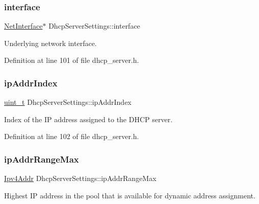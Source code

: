 \subsubsection{\texorpdfstring{interface}{interface}}
{\footnotesize\ttfamily \hyperlink{net_8h_a2234db8911a1148c9159979d8f5e0d6b}{Net\+Interface}$\ast$ Dhcp\+Server\+Settings\+::interface}



Underlying network interface. 



Definition at line 101 of file dhcp\+\_\+server.\+h.

\mbox{\label{structDhcpServerSettings_aaad90677f7fa180236c4ae488ed076f1}} 
\subsubsection{\texorpdfstring{ip\+Addr\+Index}{ipAddrIndex}}
{\footnotesize\ttfamily \hyperlink{compiler__port_8h_a12a1e9b3ce141648783a82445d02b58d}{uint\+\_\+t} Dhcp\+Server\+Settings\+::ip\+Addr\+Index}



Index of the IP address assigned to the D\+H\+CP server. 



Definition at line 102 of file dhcp\+\_\+server.\+h.

\mbox{\label{structDhcpServerSettings_ad1ffb003f59319b0c15e43a6a5e4fa7a}} 
\subsubsection{\texorpdfstring{ip\+Addr\+Range\+Max}{ipAddrRangeMax}}
{\footnotesize\ttfamily \hyperlink{ipv4_8h_a411debb3d770caa0c06d3f73367da37f}{Ipv4\+Addr} Dhcp\+Server\+Settings\+::ip\+Addr\+Range\+Max}



Highest IP address in the pool that is available for dynamic address assignment. 



